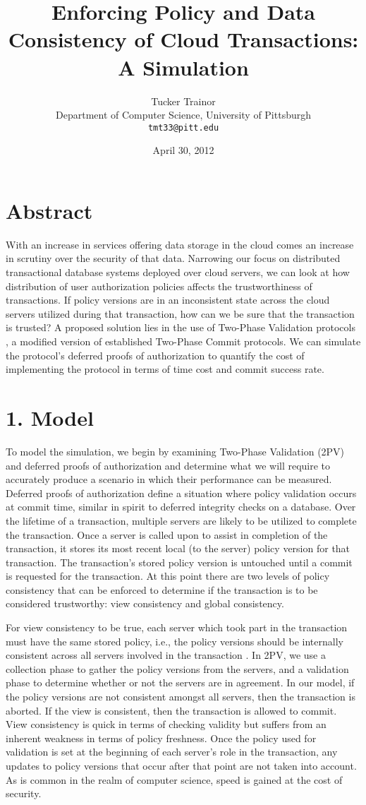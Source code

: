 \documentclass[11pt]{article}
\title{Enforcing Policy and Data Consistency of Cloud Transactions: A Simulation}
\author{Tucker Trainor\\Department of Computer Science, University of Pittsburgh\\\texttt{tmt33@pitt.edu}}
\date{April 30, 2012} %
\begin{document}
\maketitle
\section{Abstract}
With an increase in services offering data storage in the cloud comes an increase in scrutiny over the security of that data. Narrowing our focus on distributed transactional database systems deployed over cloud servers, we can look at how distribution of user authorization policies affects the trustworthiness of transactions. If policy versions are in an inconsistent state across the cloud servers utilized during that transaction, how can we be sure that the transaction is trusted? A proposed solution lies in the use of Two-Phase Validation protocols \cite{Iskander}, a modified version of established Two-Phase Commit protocols. We can simulate the protocol's deferred proofs of authorization to quantify the cost of implementing the protocol in terms of time cost and commit success rate.
\section{1. Model}
To model the simulation, we begin by examining Two-Phase Validation (2PV) and deferred proofs of authorization and determine what we will require to accurately produce a scenario in which their performance can be measured.
Deferred proofs of authorization define a situation where policy validation occurs at commit time, similar in spirit to deferred integrity checks on a database. Over the lifetime of a transaction, multiple servers are likely to be utilized to complete the transaction. Once a server is called upon to assist in completion of the transaction, it stores its most recent local (to the server) policy version for that transaction. The transaction's stored policy version is untouched until a commit is requested for the transaction. At this point there are two levels of policy consistency that can be enforced to determine if the transaction is to be considered trustworthy: view consistency and global consistency.

For view consistency to be true, each server which took part in the transaction must have the same stored policy, i.e., the policy versions should be internally consistent across all servers involved in the transaction \cite{Iskander}. In 2PV, we use a collection phase to gather the policy versions from the servers, and a validation phase to determine whether or not the servers are in agreement. In our model, if the policy versions are not consistent amongst all servers, then the transaction is aborted. If the view is consistent, then the transaction is allowed to commit. View consistency is quick in terms of checking validity but suffers from an inherent weakness in terms of policy freshness. Once the policy used for validation is set at the beginning of each server's role in the transaction, any updates to policy versions that occur after that point are not taken into account. As is common in the realm of computer science, speed is gained at the cost of security.
\end{document}
